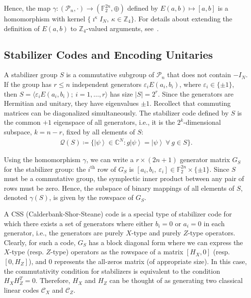 \documentclass[journal,onecolumn]{IEEEtran}
\newcommand{\dket}[1]{\left\lvert #1 \right\rangle}
\newcommand{\MCC}{\mathcal{C}}
\begin{document}
Hence, the map $\gamma \colon (\mathcal{P}_n, \cdot) \rightarrow (\mathbb{F}_2^{2n}, \oplus)$ defined by $E(a,b) \mapsto [a,b]$ is a homomorphism with kernel $\{ \imath^\kappa I_N,\ \kappa \in \mathbb{Z}_4 \}$.
For details about extending the definition of $E(a,b)$ to $\mathbb{Z}_4$-valued arguments, see~\cite{Rengaswamy-pra19}.


\subsection{Stabilizer Codes and Encoding Unitaries}
\label{sec:stabilizer_codes}

A stabilizer group $S$ is a commutative subgroup of $\mathcal{P}_n$ that does not contain $-I_N$.
If the group has $r \leq n$ independent generators $\varepsilon_i E(a_i,b_i)$, where $\varepsilon_i \in \{ \pm 1 \}$, then $S = \langle \varepsilon_i E(a_i,b_i); \ i = 1,\ldots,r \rangle$ has size $|S| = 2^r$.
Since the generators are Hermitian and unitary, they have eigenvalues $\pm 1$. 
Recollect that commuting matrices can be diagonalized simultaneously.
The stabilizer code defined by $S$ is the common $+1$ eigenspace of all generators, i.e., it is the $2^k$-dimensional subspace, $k = n-r$, fixed by all elements of $S$:
\begin{align}
\mathcal{Q}(S) \coloneqq \{ \dket{\psi} \in \mathbb{C}^N \colon g \dket{\psi} = \dket{\psi}\ \forall\ g \in S \}.
\end{align}

Using the homomorphism $\gamma$, we can write a $r \times (2n+1)$ generator matrix $G_S$ for the stabilizer group: the $i^{\text{th}}$ row of $G_S$ is $[a_i,b_i,\ \varepsilon_i] \in \mathbb{F}_2^{2n} \times \{ \pm 1 \}$.
Since $S$ must be a commutative group, the symplectic inner product between any pair of rows must be zero.
Hence, the subspace of binary mappings of all elements of $S$, denoted $\gamma(S)$, is given by the rowspace of $G_S$.

A CSS (Calderbank-Shor-Steane) code is a special type of stabilizer code for which there exists a set of generators where either $b_i = 0$ or $a_i = 0$ in each generator, i.e., the generators are purely $X$-type and purely $Z$-type operators.
Clearly, for such a code, $G_S$ has a block diagonal form where we can express the $X$-type (resp. $Z$-type) operators as the rowspace of a matrix $[H_X, 0]$ (resp. $[0, H_Z]$), and $0$ represents the all-zeros matrix (of appropriate size).
In this case, the commutativity condition for stabilizers is equivalent to the condition $H_X H_Z^T = 0$.
Therefore, $H_X$ and $H_Z$ can be thought of as generating two classical linear codes $\MCC_X$ and $\MCC_Z$.
\end{document}
